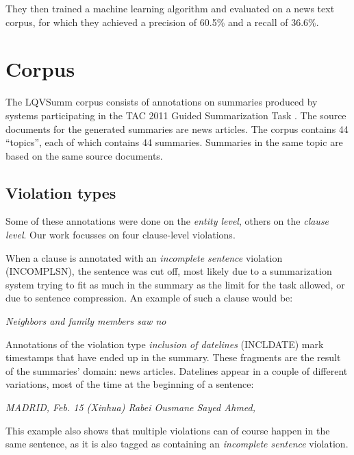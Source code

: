 \documentclass[a4paper,10pt]{scrartcl}
\theoremstyle{style}
\begin{document}
They then trained a machine learning algorithm \citep{cohen1996learning} and evaluated on a news text corpus, for which they achieved a precision of 60.5\% and a recall of 36.6\%.

\newpage
\section{Corpus}
\label{corpus_study}
The LQVSumm corpus consists of annotations on summaries produced by systems participating in the TAC 2011 Guided Summarization Task \citep{owczarzak2011overview}. The source documents for the generated summaries are news articles.
The corpus contains 44 ``topics'', each of which contains 44 summaries.
Summaries in the same topic are based on the same source documents.

\subsection{Violation types}

Some of these annotations were done on the \textit{entity level}, others on the \textit{clause level}. Our work focusses on four clause-level violations.

When a clause is annotated with an \textit{incomplete sentence} violation (INCOMPLSN), the sentence was cut off, most likely due to a summarization system trying to fit as much in the summary as the limit for the task allowed, or due to sentence compression. An example of such a clause would be:

\begin{framed}
\quad\textit{Neighbors and family members saw no}
\end{framed}

Annotations of the violation type \textit{inclusion of datelines} (INCLDATE) mark timestamps that have ended up in the summary. These fragments are the result of the summaries' domain: news articles. Datelines appear in a couple of different variations, most of the time at the beginning of a sentence:

\begin{framed}
\quad\textit{MADRID, Feb. 15 (Xinhua) Rabei Ousmane Sayed Ahmed,}
\end{framed}

This example also shows that multiple violations can of course happen in the same sentence, as it is also tagged as containing an \textit{incomplete sentence} violation.
\end{document}
